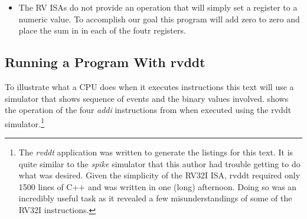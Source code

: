 \begin{itemize}
\item The RV ISAs do not provide an operation that will simply 
	set a register to a numeric value.  To accomplish our goal this
	program will add zero to zero and place the sum in in each of the
	foutr registers.
\end{itemize}


\subsection{Running a Program With rvddt}

To illustrate what a CPU does when it executes instructions this text
will use a simulator that shows sequence of events and the binary values
involved.   shows the operation of the four 
{\em addi} instructions from  when executed using the 
\gls{rvddt} simulator.\footnote{The {\em rvddt} application was written to 
generate the listings for this text.  It is quite similar to the {\em spike}
simulator that this author had trouble getting to do what was desired.  
Given the simplicity of the RV32I ISA, rvddt required only 1500 
lines of C++ and was written in one (long) afternoon.  Doing so was an
incredibly useful task as it revealed a few misunderstandings of some of 
the RV32I instructions.}


